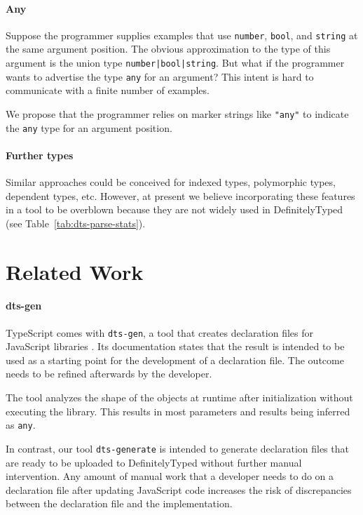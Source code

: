 \documentclass[sigconf]{acmart}
\begin{document}
\paragraph*{Any}
Suppose the programmer supplies examples that use \lstinline/number/, \lstinline/bool/, and
\lstinline/string/ at the same argument position. The obvious approximation to the type of
this argument is the union type \lstinline/number|bool|string/. But what if the programmer
wants to advertise the type \lstinline/any/ for an argument? This intent is hard to
communicate with a finite number of examples.

We propose that the programmer relies on marker strings like \lstinline/"any"/ to indicate
the \lstinline/any/ type for an argument position.

\paragraph*{Further types}
Similar approaches could be conceived for indexed types, polymorphic types, dependent
types, etc. However, at present we believe incorporating these features in a tool to be
overblown because they are not widely used in DefinitelyTyped (see
Table~\ref{tab:dts-parse-stats}). 

\section{Related Work}
\label{sec:related-work}
\paragraph*{dts-gen}
TypeScript comes with \texttt{dts-gen}, a tool that creates declaration files for
JavaScript libraries \cite{dts-gen}. Its documentation states that the result is 
intended to be used as a starting point for the development of a declaration file. The outcome
needs to be refined afterwards by the developer. 

The tool analyzes the shape of the objects at runtime after initialization without
executing the library. This results in most parameters and results being inferred as
\lstinline[language={}]{any}.

In contrast, our tool \texttt{dts-generate} is intended to generate declaration files
that are ready to be uploaded to DefinitelyTyped without further manual intervention. Any
amount of manual work that a developer needs to do on a declaration file after updating
JavaScript code increases the risk of discrepancies between the declaration file
and the implementation.
\end{document}
